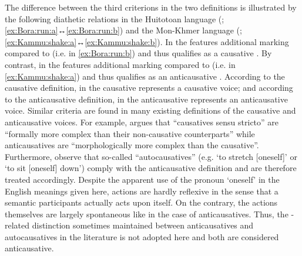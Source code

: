 The difference between the third criterions in the two definitions is illustrated by the following diathetic relations in the Huitotoan language  (; \ref{ex:Bora:run:a}↔\ref{ex:Bora:run:b}) and the Mon-Khmer language  (; \ref{ex:Kammu:shake:a}↔\ref{ex:Kammu:shake:b}). In the    features additional marking compared to  (i.e.  in \ref{ex:Bora:run:b}) and thus qualifies as a causative . By contrast, in the    features additional marking compared to  (i.e.  in \ref{ex:Kammu:shake:a}) and thus qualifies as an anticausative . According to the causative definition,  in the  causative  represents a causative voice; and according to the anticausative definition,  in the  anticausative  represents an anticausative voice. Similar criteria are found in many existing definitions of the causative and anticausative voices. For example, \citet[888]{kulikov:2001} argues that “causatives sensu stricto” are “formally more complex than their non-causative counterparts” while anticausatives are “morphologically more complex than the causative”. Furthermore, observe that so-called “autocausatives” (e.g. ‘to stretch [oneself]’ or ‘to sit [oneself] down’) comply with the anticausative definition and are therefore treated accordingly. Despite the apparent use of the pronoun ‘oneself’ in the English meanings given here,  actions are hardly reflexive in the sense that a semantic participants actually acts upon itself. On the contrary, the actions themselves are largely spontaneous like in the case of anticausatives. Thus, the -related distinction sometimes maintained between anticausatives and autocausatives in the literature is not adopted here and both are considered anticausative.

